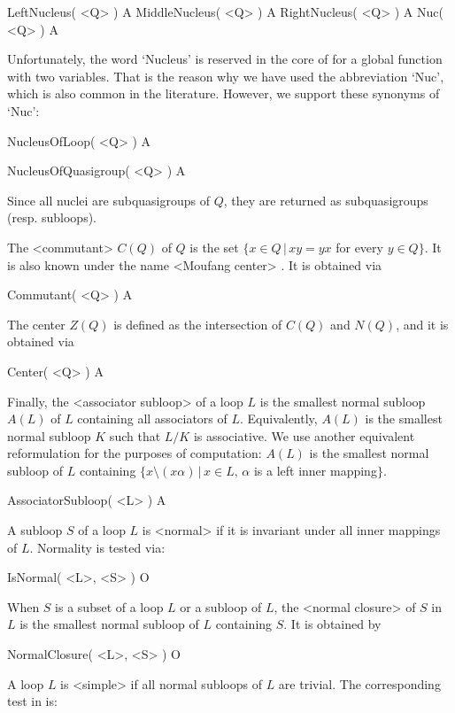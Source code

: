 \>LeftNucleus( <Q> ) A
\>MiddleNucleus( <Q> ) A
\>RightNucleus( <Q> ) A
\>Nuc( <Q> ) A

Unfortunately, the word `Nucleus' is reserved in the core of {\GAP} for a
global function with two variables. That is the reason why we have used the
abbreviation `Nuc', which is also common in the literature. However, we support
these synonyms of `Nuc':

\>NucleusOfLoop( <Q> ) A

\>NucleusOfQuasigroup( <Q> ) A

Since all nuclei are subquasigroups of $Q$, they are returned as subquasigroups
(resp. subloops).

The <commutant>
%
%
 $C(Q)$ of $Q$ is the set $\{x\in Q\,|\,xy=yx$
for every $y\in Q\}$. It is also known under the name <Moufang center>
%
%
.
It is obtained via

\>Commutant( <Q> ) A

The center $Z(Q)$ is defined as the intersection of $C(Q)$ and $N(Q)$, and it
is obtained via

\>Center( <Q> ) A

Finally, the <associator subloop>
%
%
of a loop $L$ is the smallest normal subloop $A(L)$ of $L$
containing all associators of $L$. Equivalently, $A(L)$ is the
smallest normal subloop $K$ such that $L/K$ is associative. We use
another equivalent reformulation for the purposes of computation:
$A(L)$ is the smallest normal subloop of $L$ containing
$\{x\setminus(x\alpha)\,|\,x\in L,\,\alpha$ is a left inner
mapping$\}$.

\>AssociatorSubloop( <L> )  A


A subloop $S$ of a loop $L$ is <normal> if it is
invariant under all inner mappings of $L$. Normality is tested via:

\>IsNormal( <L>, <S> ) O

When $S$ is a subset of a loop $L$ or a subloop of $L$, the <normal closure>
%
%
 of $S$ in $L$ is the smallest normal subloop of $L$ containing $S$. It
is obtained by

\>NormalClosure( <L>, <S> ) O

A loop $L$ is <simple> if all normal subloops of $L$ are
trivial. The corresponding test in {\LOOPS} is:

